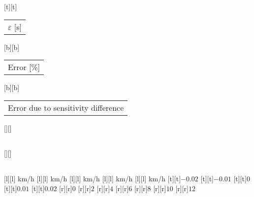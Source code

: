 %
[t][t]{\fontsize{8}{12}\selectfont \setlength{\tabcolsep}{0pt}\begin{tabular}{c}$\varepsilon$ [s]\end{tabular}}%
[b][b]{\fontsize{8}{12}\selectfont \setlength{\tabcolsep}{0pt}\begin{tabular}{c}Error [\%]\end{tabular}}%
[b][b]{\fontsize{8}{12}\selectfont \setlength{\tabcolsep}{0pt}\begin{tabular}{c}Error due to sensitivity difference\end{tabular}}%
[][]{\fontsize{8}{12}\selectfont \setlength{\tabcolsep}{0pt}\begin{tabular}{c} \end{tabular}}%
[][]{\fontsize{8}{12}\selectfont \setlength{\tabcolsep}{0pt}\begin{tabular}{c} \end{tabular}}%
[l][l]{\fontsize{6}{8} km/h}%
[l][l]{\fontsize{6}{8} km/h}%
[l][l]{\fontsize{6}{8} km/h}%
[l][l]{\fontsize{6}{8} km/h}%
[l][l]{\fontsize{6}{8} km/h}%
%
\fontsize{8}{12}%
\selectfont%
%
[t][t]{$-0.02$}%
[t][t]{$-0.01$}%
[t][t]{$0$}%
[t][t]{$0.01$}%
[t][t]{$0.02$}%
%
[r][r]{$0$}%
[r][r]{$2$}%
[r][r]{$4$}%
[r][r]{$6$}%
[r][r]{$8$}%
[r][r]{$10$}%
[r][r]{$12$}%
%
%
